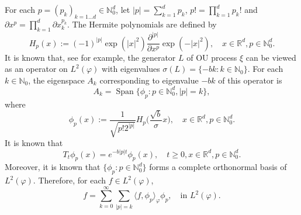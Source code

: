 \documentclass[12pt, a4paper]{amsart}
\theoremstyle{definition}
\numberwithin{equation}{section}
\begin{document}
    For each $p = (p_k)_{k = 1\dots d} \in \mathbb{N}_0^{d}$, let $|p|=\sum_{k=1}^d p_k$, $p!= \prod_{k= 1}^d p_k !$ and $\partial x^p = \prod_{k = 1}^d\partial x_k^{p_k}$. 
    The Hermite polynomials are defined by
\begin{equation}
    H_p(x)
    :=(-1)^{|p|}\exp(|x|^2) \frac{\partial ^{|p|}}{\partial x^p} \exp(-|x|^2) ,
    \quad x\in \mathbb R^d, p \in \mathbb{N}_0^{d}.
\end{equation}
It is known that, see \cite{GD} for example, the generator $L$ of OU process $\xi$ can be viewed as an operator 
on $L^2(\varphi)$ 
with eigenvalues $\sigma(L)= \{-bk: k \in \mathbb N_0\}$.
For each $k \in \mathbb N_0$, the eigenspace $A_k$ corresponding to eigenvalue $-bk$ of this operator is
\begin{equation}
    A_k 
    = \operatorname{Span} \{\phi_p : p\in \mathbb N_0^d, |p|=k\},
\end{equation}
where
\begin{equation}\label{eigenfunction}
	\phi_p(x) 
    := \frac{1}{\sqrt{ p! 2^{|p|} }} H_p \Big(\frac{ \sqrt{b} }{\sigma}x \Big),
    \quad x\in \mathbb{R}^d, p\in \mathbb N_0^d.
\end{equation}
 It is known that 
\begin{equation}\label{semigroupformula}
    T_t\phi_p(x)
    =e^{-b|p|t}\phi_p(x),
    \quad t\geq 0, x\in \mathbb{R}^d, p\in \mathbb N_0^d.
\end{equation}
Moreover, it is known that $\{\phi_p: p \in \mathbb N_0^d\}$ forms a complete orthonormal basis of $L^2(\varphi)$. 
Therefore, for each $f\in L^2(\varphi)$, 
\begin{equation}\label{semicomp1}
    f
    =\sum_{k=0}^{\infty}\sum_{|p|=k}\langle f, \phi_p \rangle_{\varphi} \phi_p, 
    \quad \text{in~} L^2(\varphi).
\end{equation}
\end{document}
